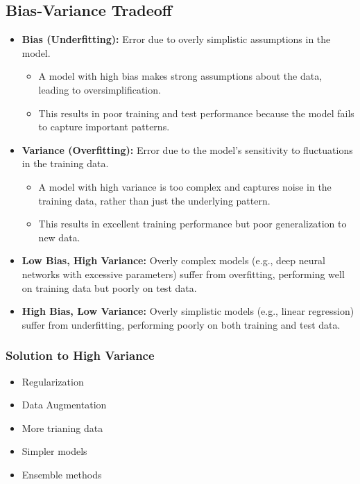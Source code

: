 \documentclass{article}
\begin{document}
\subsection{Bias-Variance Tradeoff}
\begin{definition}
    \begin{itemize}
        \item \textbf{Bias (Underfitting):} Error due to overly simplistic assumptions in the model.
        \begin{itemize}
            \item A model with high bias makes strong assumptions about the data, leading to oversimplification.
            \item This results in poor training and test performance because the model fails to capture important patterns.
        \end{itemize}
        \item \textbf{Variance (Overfitting):} Error due to the model's sensitivity to fluctuations in the training data.
        \begin{itemize}
            \item A model with high variance is too complex and captures noise in the training data, rather than just the underlying pattern.
            \item This results in excellent training performance but poor generalization to new data.
        \end{itemize}
        \item \textbf{Low Bias, High Variance:} Overly complex models (e.g., deep neural networks with excessive parameters) suffer from overfitting, performing well on training data but poorly on test data.
        \item \textbf{High Bias, Low Variance:} Overly simplistic models (e.g., linear regression) suffer from underfitting, performing poorly on both training and test data.
    \end{itemize}
\end{definition}

\subsubsection{Solution to High Variance}
\begin{definition}
    \begin{itemize}
        \item Regularization
        \item Data Augmentation
        \item More trianing data 
        \item Simpler models
        \item Ensemble methods
    \end{itemize}
\end{definition}
\end{document}
